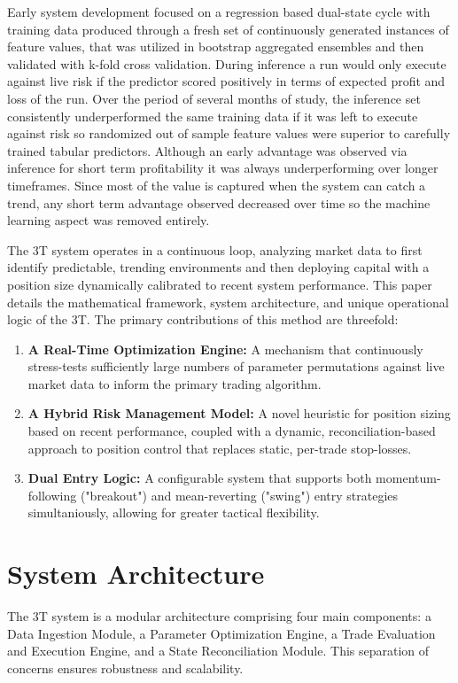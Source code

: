 \documentclass[11pt]{article}
\begin{document}
Early system development focused on a regression based dual-state cycle with training data produced through a fresh set of continuously generated instances of feature values, that was utilized in bootstrap aggregated ensembles and then validated with k-fold cross validation. During inference a run would only execute against live risk if the predictor scored positively in terms of expected profit and loss of the run. Over the period of several months of study, the inference set consistently underperformed the same training data if it was left to execute against risk so randomized out of sample feature values were superior to carefully trained tabular predictors. Although an early advantage was observed via inference for short term profitability it was always underperforming over longer timeframes. Since most of the value is captured when the system can catch a trend, any short term advantage observed decreased over time so the machine learning aspect was removed entirely. 

The 3T system operates in a continuous loop, analyzing market data to first identify predictable, trending environments and then deploying capital with a position size dynamically calibrated to recent system performance. This paper details the mathematical framework, system architecture, and unique operational logic of the 3T. The primary contributions of this method are threefold:
\begin{enumerate}
    \item \textbf{A Real-Time Optimization Engine:} A mechanism that continuously stress-tests sufficiently large numbers of parameter permutations against live market data to inform the primary trading algorithm.
    \item \textbf{A Hybrid Risk Management Model:} A novel heuristic for position sizing based on recent performance, coupled with a dynamic, reconciliation-based approach to position control that replaces static, per-trade stop-losses.
    \item \textbf{Dual Entry Logic:} A configurable system that supports both momentum-following ("breakout")\cite{lefevre1923} and mean-reverting ("swing")\cite{taylor1950} entry strategies simultaniously, allowing for greater tactical flexibility.
\end{enumerate}

\section{System Architecture}
The 3T system is a modular architecture comprising four main components: a Data Ingestion Module, a Parameter Optimization Engine, a Trade Evaluation and Execution Engine, and a State Reconciliation Module. This separation of concerns ensures robustness and scalability.
\end{document}
